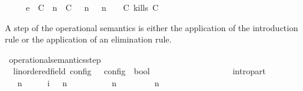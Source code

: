 \begin{isabellebody}
\ \ \ \ \ {\isasymhookrightarrow}\isactrlsub e\ \ {\isacharparenleft}{\isacharparenleft}{\isacharparenleft}C\ {\isasymUp}\ n{\isacharparenright}\ {\isacharhash}\ {\isacharparenleft}C\ {\isasymnot}{\isasymUp}\ {\isasymge}\ n{\isacharparenright}\ {\isacharhash}\ {\isasymGamma}{\isacharparenright}{\isacharcomma}\ n\ {\isasymturnstile}\ {\isasymPsi}\ {\isasymtriangleright}\ {\isacharparenleft}{\isacharparenleft}C\ kills\ C\ {\isacharhash}\ {\isasymPhi}{\isacharparenright}{\isacharparenright}{\isacartoucheclose}%
\begin{isamarkuptext}%
A step of the operational semantics is either the application of the introduction 
  rule or the application of an elimination rule.%
\end{isamarkuptext}\isamarkuptrue%
\isamarkupfalse%
\ operational{\isacharunderscore}semantics{\isacharunderscore}step\isanewline
\ \ {\isacharcolon}{\isacharcolon}{\isacartoucheopen}{\isacharparenleft}{\isacharprime}{\isasymtau}{\isacharcolon}{\isacharcolon}linordered{\isacharunderscore}field{\isacharparenright}\ config\ {\isasymRightarrow}\ {\isacharprime}{\isasymtau}\ config\ {\isasymRightarrow}\ bool{\isacartoucheclose}\ \ \ \ \ \ \ \ \ \ \ \ \ \ {\isacharparenleft}{\isacartoucheopen}{\isacharunderscore}\ {\isasymhookrightarrow}\ {\isacharunderscore}{\isacartoucheclose}\ {}{}{\isacharparenright}\isanewline
{}\isanewline
\ \ intro{\isacharunderscore}part{\isacharcolon}\isanewline
\ \ {\isacartoucheopen}{\isacharparenleft}{\isasymGamma}\ n\ {\isasymturnstile}\ {\isasymPsi}\ {\isasymtriangleright}\ {\isasymPhi}\ \ {\isasymhookrightarrow}\isactrlsub i\ \ {\isacharparenleft}{\isasymGamma}\ n\ {\isasymturnstile}\ {\isasymPsi}\ {\isasymtriangleright}\ {\isasymPhi}\isanewline
\ \ \ \ {\isasymLongrightarrow}\ {\isacharparenleft}{\isasymGamma}\ n\ {\isasymturnstile}\ {\isasymPsi}\ {\isasymtriangleright}\ {\isasymPhi}\ \ {\isasymhookrightarrow}\ \ {\isacharparenleft}{\isasymGamma}\ n\ {\isasymturnstile}\ {\isasymPsi}\ {\isasymtriangleright}\ {\isasymPhi}\isanewline

\end{isabellebody}
